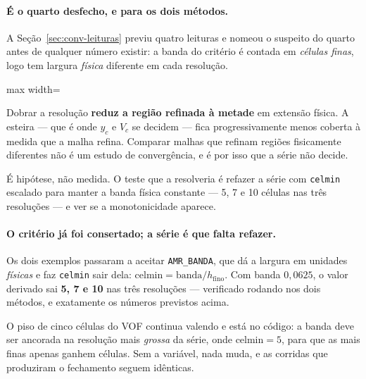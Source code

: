 \paragraph{\'E o quarto desfecho, e para os dois m\'etodos.} A
Se\c{c}\~ao~\ref{sec:conv-leituras} previu quatro leituras e nomeou o suspeito do
quarto antes de qualquer n\'umero existir: a banda do crit\'erio \'e contada em
\emph{c\'elulas finas}, logo tem largura \emph{f\'isica} diferente em cada
resolu\c{c}\~ao.

\begin{adjustbox}{max width=\linewidth}
\end{adjustbox}

Dobrar a resolu\c{c}\~ao \textbf{reduz a regi\~ao refinada \`a metade} em extens\~ao
f\'isica. A esteira --- que \'e onde $y_c$ e $V_c$ se decidem --- fica
progressivamente menos coberta \`a medida que a malha refina. Comparar malhas que
refinam regi\~oes fisicamente diferentes n\~ao \'e um estudo de converg\^encia,
e \'e por isso que a s\'erie n\~ao decide.

\'E hip\'otese, n\~ao medida. O teste que a resolveria \'e refazer a s\'erie com
\texttt{celmin} escalado para manter a banda f\'isica constante --- 5, 7 e 10
c\'elulas nas tr\^es resolu\c{c}\~oes --- e ver se a monotonicidade aparece.

\paragraph{O crit\'erio j\'a foi consertado; a s\'erie \'e que falta refazer.} Os
dois exemplos passaram a aceitar \texttt{AMR\_BANDA}, que d\'a a largura em
unidades \emph{f\'isicas} e faz \texttt{celmin} sair dela:
$\text{celmin} = \text{banda}/h_{\text{fino}}$. Com banda $0{,}0625$, o valor
derivado sai \textbf{5, 7 e 10} nas tr\^es resolu\c{c}\~oes --- verificado rodando
nos dois m\'etodos, e exatamente os n\'umeros previstos acima.

O piso de cinco c\'elulas do VOF continua valendo e est\'a no c\'odigo: a banda
deve ser ancorada na resolu\c{c}\~ao mais \emph{grossa} da s\'erie, onde
$\text{celmin}=5$, para que as mais finas apenas ganhem c\'elulas. Sem a
vari\'avel, nada muda, e as corridas que produziram o fechamento seguem
id\^enticas.

